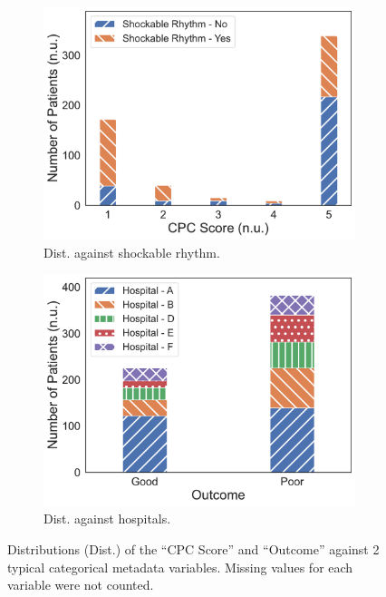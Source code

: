 \begin{figure}[!htp]
\centering
\begin{subfigure}[t]{0.49\linewidth}
    \centering
    \includegraphics[width=\textwidth]{images/cpc-vfib-corr.pdf}
    \caption[]
    {Dist. against shockable rhythm.}
    \label{fig:cpc_vfib_corr}
\end{subfigure}
\hfill
\begin{subfigure}[t]{0.49\linewidth}
    \centering
    \includegraphics[width=\textwidth]{images/outcome-hospital-corr.pdf}
    \caption[]
    {Dist. against hospitals.}
    \label{fig:outcome_hospital_corr}
\end{subfigure}
\caption[]
{Distributions (Dist.) of the ``CPC Score'' and ``Outcome'' against 2 typical categorical metadata variables. Missing values for each variable were not counted.}
\label{fig:outcome_corr}
\end{figure}
